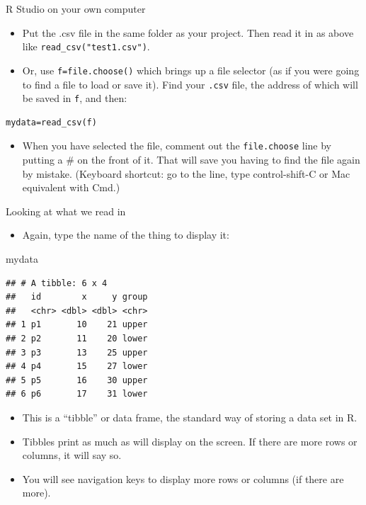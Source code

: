 \documentclass[ignorenonframetext,]{beamer}
\newenvironment{Shaded}{\begin{snugshade}}{\end{snugshade}}
\newcommand{\NormalTok}[1]{#1}
\providecommand{\tightlist}{%
  \setlength{\itemsep}{0pt}\setlength{\parskip}{0pt}}
\begin{document}
\begin{frame}[fragile]{R Studio on your own computer}
\protect\hypertarget{r-studio-on-your-own-computer}{}

\begin{itemize}
\tightlist
\item
  Put the .csv file in the same folder as your project. Then read it in
  as above like \texttt{read\_csv("test1.csv")}.
\item
  Or, use \texttt{f=file.choose()} which brings up a file selector (as
  if you were going to find a file to load or save it). Find your
  \texttt{.csv} file, the address of which will be saved in \texttt{f},
  and then:
\end{itemize}

\begin{verbatim}
mydata=read_csv(f)
\end{verbatim}

\begin{itemize}
\tightlist
\item
  When you have selected the file, comment out the \texttt{file.choose}
  line by putting a \# on the front of it. That will save you having to
  find the file again by mistake. (Keyboard shortcut: go to the line,
  type control-shift-C or Mac equivalent with Cmd.)
\end{itemize}

\end{frame}

\begin{frame}[fragile]{Looking at what we read in}
\protect\hypertarget{looking-at-what-we-read-in}{}

\begin{itemize}
\tightlist
\item
  Again, type the name of the thing to display it:
\end{itemize}

\begin{Shaded}
\begin{Highlighting}[]
\NormalTok{mydata}
\end{Highlighting}
\end{Shaded}

\begin{verbatim}
## # A tibble: 6 x 4
##   id        x     y group
##   <chr> <dbl> <dbl> <chr>
## 1 p1       10    21 upper
## 2 p2       11    20 lower
## 3 p3       13    25 upper
## 4 p4       15    27 lower
## 5 p5       16    30 upper
## 6 p6       17    31 lower
\end{verbatim}

\begin{itemize}
\tightlist
\item
  This is a ``tibble'' or data frame, the standard way of storing a data
  set in R.
\item
  Tibbles print as much as will display on the screen. If there are more
  rows or columns, it will say so.
\item
  You will see navigation keys to display more rows or columns (if there
  are more).
\end{itemize}

\end{frame}
\end{document}
